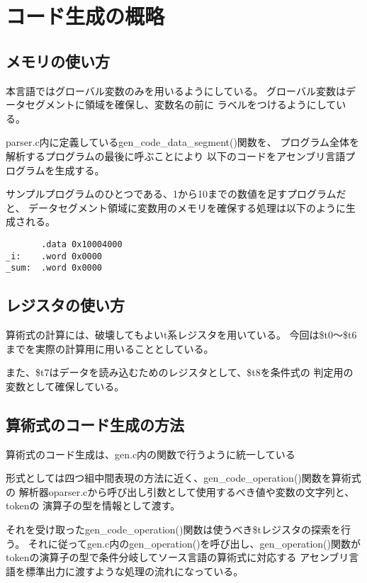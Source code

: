 \documentclass[11pt,a4j]{jarticle}
\begin{document}

\section{コード生成の概略}

\subsection{メモリの使い方}

本言語ではグローバル変数のみを用いるようにしている。
グローバル変数はデータセグメントに領域を確保し、変数名の前に
ラベルをつけるようにしている。

parser.c内に定義しているgen\_code\_data\_segment()関数を、
プログラム全体を解析するプログラムの最後に呼ぶことにより
以下のコードをアセンブリ言語プログラムを生成する。

サンプルプログラムのひとつである、1から10までの数値を足すプログラムだと、
データセグメント領域に変数用のメモリを確保する処理は以下のように生成される。

\begin{verbatim}
       .data 0x10004000
_i:    .word 0x0000
_sum:  .word 0x0000
\end{verbatim}




\subsection{レジスタの使い方}

算術式の計算には、破壊してもよいt系レジスタを用いている。
今回は\$t0〜\$t6までを実際の計算用に用いることとしている。

また、\$t7はデータを読み込むためのレジスタとして、\$t8を条件式の
判定用の変数として確保している。


\subsection{算術式のコード生成の方法}

算術式のコード生成は、gen.c内の関数で行うように統一している

形式としては四つ組中間表現の方法に近く、gen\_code\_operation()関数を算術式の
解析器oparser.cから呼び出し引数として使用するべき値や変数の文字列と、tokenの
演算子の型を情報として渡す。

それを受け取ったgen\_code\_operation()関数は使うべき\$tレジスタの探索を行う。
それに従ってgen.c内のgen\_operation()を呼び出し、gen\_operation()関数が
tokenの演算子の型で条件分岐してソース言語の算術式に対応する
アセンブリ言語を標準出力に渡すような処理の流れになっている。
\end{document}
